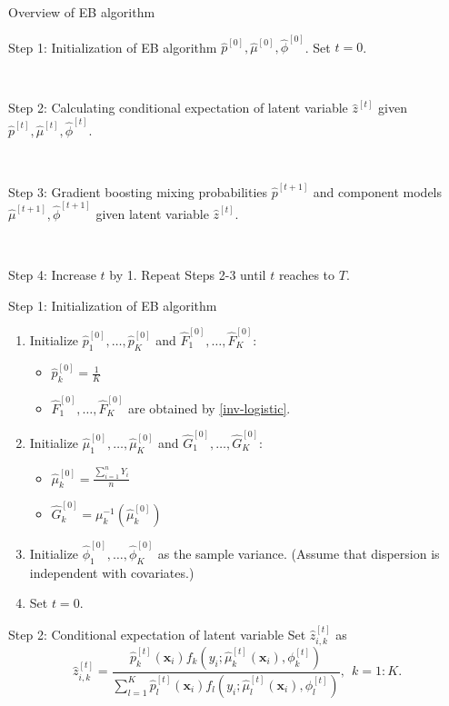 \documentclass[professionalfont]{beamer}
\def\bx{\boldsymbol{x}}
\begin{document}
\begin{frame}{Overview of EB algorithm}
	
	Step 1: Initialization of EB algorithm $\hat{p}^{[0]},\hat{\mu}^{[0]},\hat{\phi}^{[0]}$. Set $t=0$.
	
	~
	
	Step 2: Calculating conditional expectation of latent variable $\hat{z}^{[t]}$ given $\hat{p}^{[t]},\hat{\mu}^{[t]},\hat{\phi}^{[t]}$.
	
	~
	
	Step 3: Gradient boosting mixing probabilities $\hat{p}^{[t+1]}$ and component models $\hat{\mu}^{[t+1]},\hat{\phi}^{[t+1]}$ given latent variable $\hat{z}^{[t]}$.
	
	~ 
	
	Step 4: Increase $t$ by 1. Repeat Steps 2-3 until $t$ reaches to $T$.
\end{frame}

\begin{frame}{Step 1: Initialization of EB algorithm}
\begin{enumerate}
	\item Initialize $\hat{p}_1^{[0]}, \ldots,\hat{p}_K^{[0]}$ and   $\hat{F}_1^{[0]}, \ldots, \hat{F}_{K}^{[0]}$:
	
	\begin{itemize}
		\item 	$\hat{p}_k^{[0]}=\frac{1}{K}$
		\item $\hat{F}_1^{[0]}, \ldots, \hat{F}_{K}^{[0]}$ are obtained by \eqref{inv-logistic}.
	\end{itemize}
\item 
Initialize $\hat{\mu}_1^{[0]},\ldots,\hat{\mu}_K^{[0]}$ and  $\hat{G}_1^{[0]},\ldots,\hat{G}_K^{[0]}$:

\begin{itemize}
	\item $\hat{\mu}_k^{[0]}=\frac{\sum_{i=1}^nY_i}{n}$
	\item $\hat{G}_k^{[0]}=\mu_k^{-1}(\hat{\mu}_k^{[0]})$
\end{itemize}
\item Initialize $\hat{\phi}_1^{[0]},\ldots, \hat{\phi}_K^{[0]}$ as the sample variance. (Assume that dispersion is independent with covariates.)
\item 	Set $t=0$.
\end{enumerate}
	
\end{frame}

\begin{frame}{Step 2: Conditional expectation of latent variable}
	Set $\hat{z}_{i,k}^{[t]}$ as 
	\begin{equation*}
		\hat{z}_{i,k}^{[t]}=\frac{\hat{p}_{k}^{[t]}(\bx_i) f_{k}\left(y_i ; \hat{\mu}_{k}^{[t]}(\bx_i), \phi_k^{[t]} \right)}{\sum_{l=1}^{K} \hat{p}_{l}^{[t]}(\bx_i) f_{l}\left(y_i ; \hat{\mu}_{l}^{[t]}(\bx_i), \phi_l^{[t]}\right)},~~ k=1:K.
	\end{equation*}
\end{frame}
\end{document}
